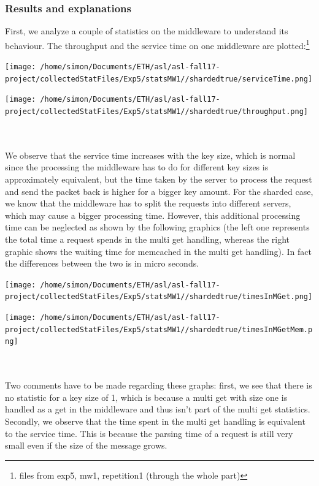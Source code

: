 \documentclass[11pt,a4paper]{article}
\begin{document}
\subsubsection{Results and explanations}
First, we analyze a couple of statistics on the middleware to understand its behaviour. The throughput and the service time on one middleware are plotted:\footnote{files from exp5, mw1, repetition1 (through the whole part)}
\\
\begin{minipage}{0.5\linewidth}
\texttt{[image: /home/simon/Documents/ETH/asl/asl-fall17-project/collectedStatFiles/Exp5/statsMW1//shardedtrue/serviceTime.png]}
\end{minipage}
\hfill
\begin{minipage}{0.5\linewidth}
\texttt{[image: /home/simon/Documents/ETH/asl/asl-fall17-project/collectedStatFiles/Exp5/statsMW1//shardedtrue/throughput.png]}
\end{minipage}
\\\\
We observe that the service time increases with the key size, which is normal since the processing the middleware has to do for different key sizes is approximately equivalent, but the time taken by the server to process the request and send the packet back is higher for a bigger key amount. For the sharded case, we know that the middleware has to split the requests into different servers, which may cause a bigger processing time. However, this additional processing time can be neglected as shown by the following graphics (the left one represents the total time a request spends in the multi get handling, whereas the right graphic shows the waiting time for memcached in the multi get handling). In fact the differences between the two is in micro seconds. 
\\
\begin{minipage}{0.5\linewidth}
\texttt{[image: /home/simon/Documents/ETH/asl/asl-fall17-project/collectedStatFiles/Exp5/statsMW1//shardedtrue/timesInMGet.png]}
\end{minipage}
\hfill
\begin{minipage}{0.5\linewidth}
\texttt{[image: /home/simon/Documents/ETH/asl/asl-fall17-project/collectedStatFiles/Exp5/statsMW1//shardedtrue/timesInMGetMem.png]}
\end{minipage}
\\\\
Two comments have to be made regarding these graphs: first, we see that there is no statistic for a key size of 1, which is because a multi get with size one is handled as a get in the middleware and thus isn't part of the multi get statistics. Secondly, we observe that the time spent in the multi get handling is equivalent to the service time. This is because the parsing time of a request is still very small even if the size of the message grows.
\end{document}
